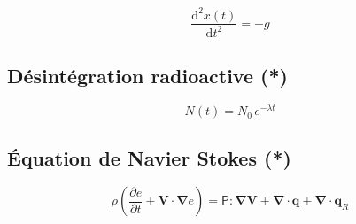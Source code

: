 $$  \frac {\mathrm {d} ^{2}x(t)}{\mathrm {d} t^{2}} = -g $$

\subsection*{Désintégration radioactive (*)}

$$ N(t)=N_{0}\,e^{-{\lambda }t}$$


\subsection*{Équation de Navier Stokes (*)}

$$ \rho \left({\dfrac {\partial e}{\partial t}}+\mathbf {V} \cdot \mathbf {\nabla } e\right)={\mathsf {P}}:\mathbf {\nabla } \mathbf {V} +\mathbf {\nabla } \cdot \mathbf {q} +\mathbf {\nabla } \cdot \mathbf {q} _{R}$$



